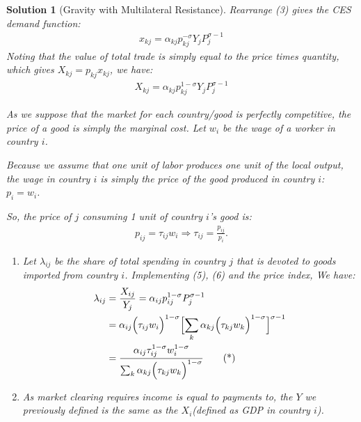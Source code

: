\documentclass[a4paper,12pt]{article} %
\theoremstyle{nonitalic}
\newtheorem{solution}{Solution}
\begin{document}
\begin{solution}[Gravity with Multilateral Resistance]
    Rearrange (3) gives the CES demand function:
    \begin{gather}
        x_{kj} = \alpha_{kj} p_{kj}^{-\sigma} Y_j P_j^{\sigma-1}
    \end{gather}
    Noting that the value of total trade is simply equal to the price times quantity, which gives $X_{kj} = p_{kj} x_{kj}$, we have:
    \begin{gather}
        X_{kj} = \alpha_{kj} p_{kj}^{1-\sigma} Y_j P_j^{\sigma-1}
    \end{gather}

    As we suppose that the market for each country/good is perfectly competitive, the price of a good is simply the marginal cost.
    Let $w_i$ be the wage of a worker in country $i$.

    Because we assume that one unit of labor produces one unit of the local output,
    the wage in country $i$ is simply the price of the good produced in country $i$: $p_i = w_i$.

    So, the price of $j$ consuming 1 unit of country $i$'s good is:
    \begin{gather}
        p_{ij} = \tau_{ij} w_i \Rightarrow \tau_{ij} = \frac{p_{ij}}{p_i}.
    \end{gather}
    \begin{enumerate}
        \item[1.] Let $\lambda_{ij}$ be the share of total spending in country $j$ that is devoted to goods imported
        from country $i$. Implementing (5), (6) and the price index, We have:
        \begin{align*}
            \lambda_{ij} &= \frac{X_{ij}}{Y_j} = \alpha_{ij} p_{ij}^{1-\sigma} P_j^{\sigma-1} \\
            &= \alpha_{ij} \Bigl( \tau_{ij} w_i \Bigr)^{1-\sigma} \Bigl[ \sum_k \alpha_{kj} \Bigl( \tau_{kj} w_k \Bigr)^{1-\sigma} \Bigr]^{\sigma-1} \\
            &= \frac{\alpha_{ij} \tau_{ij}^{1-\sigma} w_i^{1-\sigma}}{\sum_k \alpha_{kj} \Bigl( \tau_{kj} w_k \Bigr)^{1-\sigma}} \tag{*}
        \end{align*}

        \item[2.] As market clearing requires income is equal to payments to, the $Y$ we previously defined is the same as the $X_i$(defined as GDP in country $i$).
        

\end{enumerate}
\end{solution}
\end{document}
